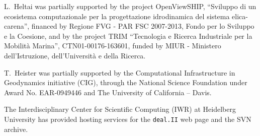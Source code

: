 \documentclass{ansarticle-preprint}
\newcommand{\specialword}[1]{\texttt{#1}}
\newcommand{\dealii}{{\specialword{deal.II}}}
\begin{document}
L.~Heltai was partially supported by the project OpenViewSHIP,
``Sviluppo di un ecosistema computazionale per la progettazione
idrodinamica del sistema elica-carena'', financed by Regione FVG - PAR
FSC 2007-2013, Fondo per lo Sviluppo e la Coesione, and by the project
TRIM ``Tecnologia e Ricerca Industriale per la Mobilit\`a Marina'',
CTN01-00176-163601, funded by MIUR -  Ministero dell'Istruzione,
dell'Universit\`a e della Ricerca.

T.~Heister was partially supported by the Computational Infrastructure in
Geodynamics initiative (CIG), through the National Science Foundation under Award
No. EAR-0949446 and The University of California -- Davis.

The Interdisciplinary Center for Scientific Computing (IWR) at Heidelberg University has provided
hosting services for the \dealii{} web page and the SVN archive.



{}

\end{document}
